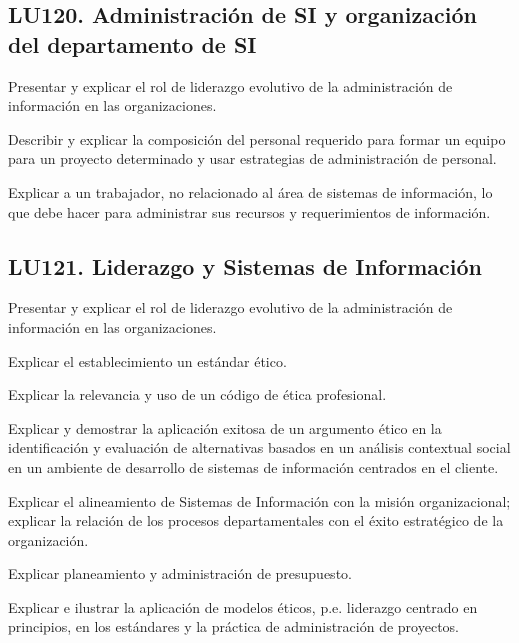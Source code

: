 \subsection{LU120. Administración de SI y organización del departamento de SI}\label{sec:LU120}
\begin{LearningUnit}
\begin{LUGoal}
\item Presentar y explicar el rol de liderazgo evolutivo de la administración de información en las organizaciones.
\end{LUGoal}

\begin{LUObjective}
\item Describir y explicar la composición del personal requerido para formar un equipo para un proyecto determinado y usar estrategias de administración de personal.
\item Explicar a un trabajador, no relacionado al área de sistemas de información, lo que debe hacer para administrar sus recursos y requerimientos de información.
\end{LUObjective}
\end{LearningUnit}

\subsection{LU121. Liderazgo y Sistemas de Información}\label{sec:LU121}
\begin{LearningUnit}
\begin{LUGoal}
\item Presentar y explicar el rol de liderazgo evolutivo de la administración de información en las organizaciones.
\end{LUGoal}

\begin{LUObjective}
\item Explicar el establecimiento un estándar ético.
\item Explicar la relevancia y uso de un código de ética profesional.
\item Explicar y demostrar la aplicación exitosa de un argumento ético en la identificación y evaluación de alternativas basados en un análisis contextual social en un ambiente de desarrollo de sistemas de información centrados en el cliente.
\item Explicar el alineamiento de Sistemas de Información con la misión organizacional; explicar la relación de los procesos departamentales con el éxito estratégico de la organización.
\item Explicar planeamiento y administración de presupuesto.
\item Explicar e ilustrar la aplicación de modelos éticos, p.e. liderazgo centrado en principios, en los estándares y la práctica de administración de proyectos.
\end{LUObjective}
\end{LearningUnit}

